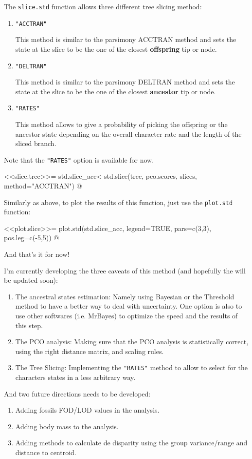 \documentclass[a4paper,11pt]{article}
\begin{document}
The \texttt{slice.std} function allows three different tree slicing method:
\begin{enumerate}
\item{\texttt{"ACCTRAN"}}

This method is similar to the parsimony ACCTRAN method and sets the state at the slice to be the one of the closest \textbf{offspring} tip or node.
\item{\texttt{"DELTRAN"}}

This method is similar to the parsimony DELTRAN method and sets the state at the slice to be the one of the closest \textbf{ancestor} tip or node.
\item{\texttt{"RATES"}}

This method allows to give a probability of picking the offspring or the ancestor state depending on the overall character rate and the length of the sliced branch.
\end{enumerate}
Note that the \texttt{"RATES"} option is available for now.

<<slice.tree>>=
std.slice_acc<-std.slice(tree, pco.scores, slices, method="ACCTRAN")
@

Similarly as above, to plot the results of this function, just use the \texttt{plot.std} function:

<<plot.slice>>=
plot.std(std.slice_acc, legend=TRUE, pars=c(3,3), pos.leg=c(-5,5))
@

And that's it for now!

I'm currently developing the three caveats of this method (and hopefully the will be updated soon):
\begin{enumerate}
\item{The ancestral states estimation:} Namely using Bayesian or the Threshold method to have a better way to deal with uncertainty. One option is also to use other softwares (i.e. MrBayes) to optimize the speed and the results of this step.
\item{The PCO analysis:} Making sure that the PCO analysis is statistically correct, using the right distance matrix, and scaling rules.
\item{The Tree Slicing:} Implementing the \texttt{"RATES"} method to allow to select for the characters states in a less arbitrary way.
\end{enumerate}
And two future directions needs to be developed:
\begin{enumerate}
\item{Adding fossils FOD/LOD values in the analysis.}
\item{Adding body mass to the analysis.}
\item{Adding methods to calculate de disparity using the group variance/range and distance to centroid.}
\end{enumerate}
\end{document}
